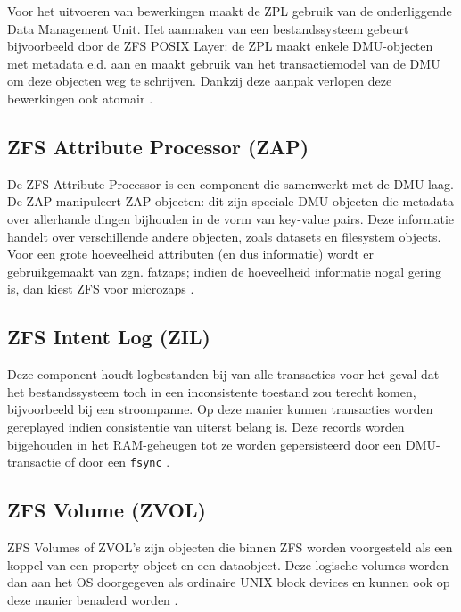 Voor het uitvoeren van bewerkingen maakt de ZPL gebruik van de onderliggende Data Management Unit. Het aanmaken van een bestandssysteem gebeurt bijvoorbeeld door de ZFS POSIX Layer: de ZPL maakt enkele DMU-objecten met metadata e.d. aan en maakt gebruik van het transactiemodel van de DMU om deze objecten weg te schrijven. Dankzij deze aanpak verlopen deze bewerkingen ook atomair \autocite{ZFSBonwick}. 

\subsection{ZFS Attribute Processor (ZAP)}

De ZFS Attribute Processor is een component die samenwerkt met de DMU-laag. De ZAP manipuleert ZAP-objecten: dit zijn speciale DMU-objecten die metadata over allerhande dingen bijhouden in de vorm van key-value pairs. Deze informatie handelt over verschillende andere objecten, zoals datasets en filesystem objects. Voor een grote hoeveelheid attributen (en dus informatie) wordt er gebruikgemaakt van zgn. fatzaps; indien de hoeveelheid informatie nogal gering is, dan kiest ZFS voor microzaps \autocite{Microsystems2006}.

\subsection{ZFS Intent Log (ZIL)}

Deze component houdt logbestanden bij van alle transacties voor het geval dat het bestandssysteem toch in een inconsistente toestand zou terecht komen, bijvoorbeeld bij een stroompanne. Op deze manier kunnen transacties worden gereplayed indien consistentie van uiterst belang is. Deze records worden bijgehouden in het RAM-geheugen tot ze worden gepersisteerd door een DMU-transactie of door een \texttt{fsync} \autocite{ZFSBonwick}. 

\subsection{ZFS Volume (ZVOL)}

ZFS Volumes of ZVOL's zijn objecten die binnen ZFS worden voorgesteld als een koppel van een property object en een dataobject. Deze logische volumes worden dan aan het OS doorgegeven als ordinaire UNIX block devices en kunnen ook op deze manier benaderd worden \autocite{Microsystems2006}.

